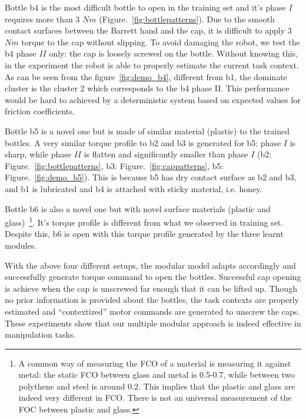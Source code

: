 Bottle b4 is the most difficult bottle to open in the training set and it's phase $I$ requires more than 3 $Nm$ (Figure.~\ref{fig:bottlepatterns}). Due to the smooth contact surfaces between the Barrett hand and the cap, it is difficult to apply 3 $Nm$ torque to the cap without slipping. To avoid damaging the robot, we test the b4 phase $II$ only: the cap is loosely screwed on the bottle. Without knowing this, in the experiment the robot is able to properly estimate the current task context. As can be seen from the figure~\ref{fig:demo_b4}, different from b1, the dominate cluster is the cluster 2 which corresponds to the b4 phase II. This performance would be hard to achieved by a deterministic system based on expected values for friction coefficients.

Bottle b5 is a novel one but is made of similar material (plastic) to the trained bottles. A very similar torque profile to b2 and b3 is generated for b5: phase $I$ is sharp, while phase $II$ is flatten and significantly smaller than phase $I$ (b2: Figure.~\ref{fig:bottlepatterns}, b3: Figure.~\ref{fig:cappatterns}, b5: Figure.~\ref{fig:demo_b5}). This is because b5 has dry contact surface as b2 and b3, and b1 is lubricated and b4 is attached with sticky material, i.e. honey.

Bottle b6 is also a novel one but with novel surface materials (plastic and glass)~\footnote{A common way of measuring the FCO of a material is measuring it against metal: the static FCO between glass and metal is 0.5-0.7, while between two polythene and steel is around 0.2. This implies that the plastic and glass are indeed very different in FCO. There is not an universal measurement of the FOC between plastic and glass.}. It's torque profile is different from what we observed in training set. Despite this, b6 is open with this torque profile generated by the three learnt modules.


With the above four different setups, the modular model adapts accordingly and successfully generate torque command to open the bottles. Successful cap opening is achieve when the cap is unscrewed far enough that it can be lifted up. Though no prior information is provided about the bottles, the task contexts are properly estimated and ``contextized'' motor commands are generated to unscrew the caps. These experiments show that our multiple modular approach is indeed effective in manipulation tasks.



